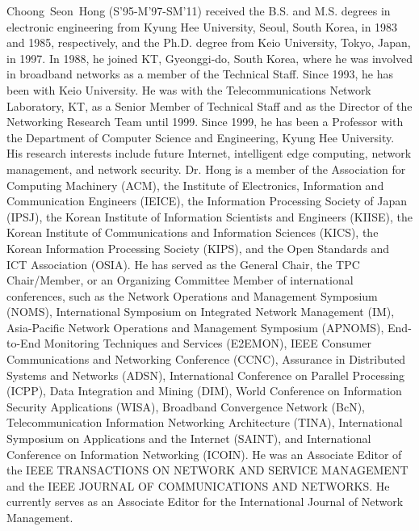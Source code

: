 \documentclass[conference]{IEEEtran}
\begin{document}
\begin{IEEEbiography}
Choong~Seon~Hong (S’95-M’97-SM’11) received the B.S. and M.S. degrees in electronic engineering from Kyung Hee University, Seoul, South Korea, in 1983 and 1985, respectively, and the Ph.D. degree from Keio University, Tokyo, Japan, in 1997. In 1988, he joined KT, Gyeonggi-do, South Korea, where he was involved in broadband networks as a member of the Technical Staff. Since 1993, he has been with Keio University. He was with the Telecommunications Network Laboratory, KT, as a Senior Member of Technical Staff and as the Director of the Networking Research Team until 1999. Since 1999, he has been a Professor with the Department of Computer Science and Engineering, Kyung Hee University. His research interests include future Internet, intelligent edge computing, network management, and network security. Dr. Hong is a member of the Association for Computing Machinery (ACM), the Institute of Electronics, Information and Communication Engineers (IEICE), the Information Processing Society of Japan (IPSJ), the Korean Institute of Information Scientists and Engineers (KIISE), the Korean Institute of Communications and Information Sciences (KICS), the Korean Information Processing Society (KIPS), and the Open Standards and ICT Association (OSIA). He has served as the General Chair, the TPC Chair/Member, or an Organizing Committee Member of international conferences, such as the Network Operations and Management Symposium (NOMS), International Symposium on Integrated Network Management (IM), Asia-Pacific Network Operations and Management Symposium (APNOMS), End-to-End Monitoring Techniques and Services (E2EMON), IEEE Consumer Communications and Networking Conference (CCNC), Assurance in Distributed Systems and Networks (ADSN), International Conference on Parallel Processing (ICPP), Data Integration and Mining (DIM), World Conference on Information Security Applications (WISA), Broadband Convergence Network (BcN), Telecommunication Information Networking Architecture (TINA), International Symposium on Applications and the Internet (SAINT), and International Conference on Information Networking (ICOIN). He was an Associate Editor of the IEEE TRANSACTIONS ON NETWORK AND SERVICE MANAGEMENT and the IEEE JOURNAL OF COMMUNICATIONS AND NETWORKS. He currently serves as an Associate Editor for the International Journal of Network Management.
\end{IEEEbiography}


\vfill
\balance
\end{document}
